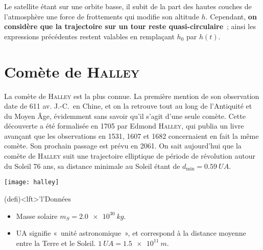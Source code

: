 \documentclass[a4paper, 10pt, final, garamond]{book}
\begin{document}

\begin{blocQR}
	\item
	Le satellite étant sur une orbite basse, il subit de la part des
	hautes couches de l'atmosphère une force de frottements qui modifie son
	altitude $h$. Cependant, \textbf{on considère que la trajectoire sur un
		tour reste quasi-circulaire}~; ainsi les expressions précédentes restent
	valables en remplaçant $h_0$ par $h(t)$.



\end{blocQR}

\resetQ
\section{Comète de \textsc{Halley}}

\noindent
\begin{minipage}{0.70\linewidth}
	La comète de \textsc{Halley} est la plus connue. La première mention de son
	observation date de 611 av. J.-C.\ en Chine, et on la retrouve tout au long
	de l'Antiquité et du Moyen Âge, évidemment sans savoir qu'il s'agit d'une
	seule comète. Cette découverte a été formalisée en 1705 par Edmond
	\textsc{Halley,} qui publia un livre avançant que les observations en 1531,
	1607 et 1682 concernaient en fait la même comète. Son prochain passage est
	prévu en 2061. On sait aujourd'hui que la comète de \textsc{Halley} suit une
	trajectoire elliptique de période de révolution autour du Soleil 76 ans, sa
	distance minimale au Soleil étant de $d_{\min} = \SI{0.59}{UA}$.
\end{minipage}
\hfill
\begin{minipage}{.25\linewidth}
	\begin{center}
		\texttt{[image: halley]}
	\end{center}
\end{minipage}
\begin{tcb}(defi)<lft>'l'{Données}
	\begin{itemize}
		\item Masse solaire $m_S = \SI{2.0e30}{kg}$.
		\item UA signifie «~unité astronomique~», et correspond à la distance
		      moyenne entre la Terre et le Soleil. $\SI{1}{UA} = \SI{1.5e11}{m}$.
	\end{itemize}
\end{tcb}
\end{document}
